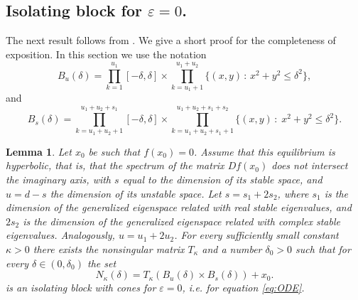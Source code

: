 \documentclass[11pt, leqno]{amsart}
\newtheorem{lem}[thm]{Lemma}
\theoremstyle{definition}
\begin{document}
\subsection{Isolating block for $\varepsilon=0$.}
\label{subsec:cont-iso-block}
The next result follows from \cite[Theorem 26]{Zgliczynski}. We give a short proof for the completeness of exposition. In this section we use the notation
$$
B_u(\delta) = \prod_{k=1}^{u_1}[-\delta, \delta] \times \prod_{k=u_1+1}^{u_1+u_2}\{(x,y)\,:\, x^2+y^2 \leq \delta^2\},
$$
and
$$
B_s(\delta) = \prod_{k=u_1+u_2+1}^{u_1+u_2+s_1}[-\delta, \delta]\times \prod_{k=u_1+u_2+s_1+1}^{u_1+u_2+s_1+s_2}\{(x,y)\,:\; x^2+y^2 \leq \delta^2\}.
$$
\begin{lem}\label{isolation:lem5}
Let $x_0$ be such that $f(x_0) = 0$. Assume that this equilibrium is hyperbolic, that is, that the spectrum of the matrix $D f(x_0)$ does not intersect the imaginary axis, with $s$ equal to the dimension of its stable space, and $u=d-s$ the dimension of its unstable space. Let $s=s_1+2s_2$, where $s_1$ is the dimension of the generalized eigenspace related with real stable eigenvalues, and $2s_2$ is the dimension of the generalized eigenspace related with complex stable eigenvalues. Analogously, $u=u_1+2u_2$. For every sufficiently small constant $\kappa>0$ there exists the nonsingular matrix $T_\kappa$ and a number $\delta_0 >0$ such that for every $\delta\in (0,\delta_0)$ the set
 $$
N_\kappa(\delta) = T_\kappa \left(B_u(\delta) \times B_s(\delta)\right)  + x_0.
$$
is an isolating block with cones for $\varepsilon=0$, i.e. for equation \eqref{eq:ODE}.
\end{lem}
\end{document}
